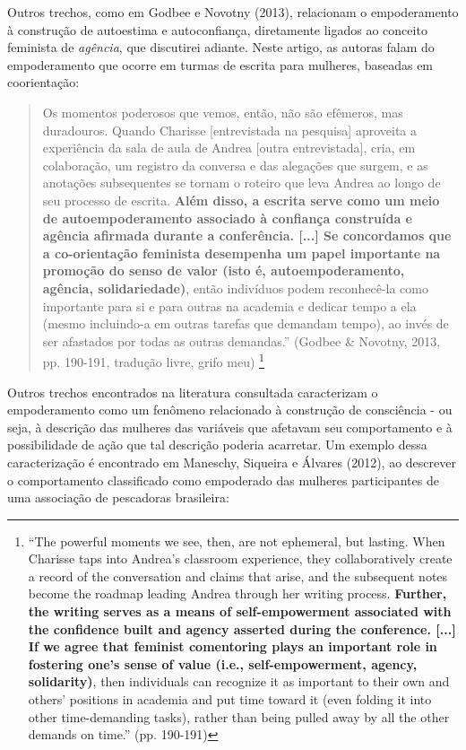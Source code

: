 Outros trechos, como em Godbee e Novotny (2013), relacionam o empoderamento à construção de autoestima e autoconfiança, diretamente ligados ao conceito feminista de \textit{agência}, que discutirei adiante. Neste artigo, as autoras falam do empoderamento que ocorre em turmas de escrita para mulheres, baseadas em coorientação:

\begin{quote}
    Os momentos poderosos que vemos, então, não são efêmeros, mas duradouros. Quando Charisse [entrevistada na pesquisa] aproveita a experiência da sala de aula de Andrea [outra entrevistada], cria, em colaboração, um registro da conversa e das alegações que surgem, e as anotações subsequentes se tornam o roteiro que leva Andrea ao longo de seu processo de escrita. \textbf{Além disso, a escrita serve como um meio de autoempoderamento associado à confiança construída e agência afirmada durante a conferência. [...] Se concordamos que a co-orientação feminista desempenha um papel importante na promoção do senso de valor (isto é, autoempoderamento, agência, solidariedade)}, então indivíduos podem reconhecê-la como importante para si e para outras na academia e dedicar tempo a ela (mesmo incluindo-a em outras tarefas que demandam tempo), ao invés de ser afastados por todas as outras demandas.'' (Godbee \& Novotny, 2013, pp. 190-191, tradução livre, grifo meu) \footnote{``The powerful moments we see, then, are not ephemeral, but lasting. When Charisse taps into Andrea’s classroom experience, they collaboratively create a record of the conversation and claims that arise, and the subsequent notes become the roadmap leading Andrea through her writing process. \textbf{Further, the writing serves as a means of self-empowerment associated with the confidence built and agency asserted during the conference. [...] If we agree that feminist comentoring plays an important role in fostering one’s sense of value (i.e., self-empowerment, agency, solidarity)}, then individuals can recognize it as important to their own and others’ positions in academia and put time toward it (even folding it into other time-demanding tasks), rather than being pulled away by all the other demands on time.'' (pp. 190-191)}
\end{quote}

Outros trechos encontrados na literatura consultada caracterizam o empoderamento como um fenômeno relacionado à construção de consciência - ou seja, à descrição das mulheres das variáveis que afetavam seu comportamento e à possibilidade de ação que tal descrição poderia acarretar. Um exemplo dessa caracterização é encontrado em Maneschy, Siqueira e Álvares (2012), ao descrever o comportamento classificado como empoderado das mulheres participantes de uma associação de pescadoras brasileira:

